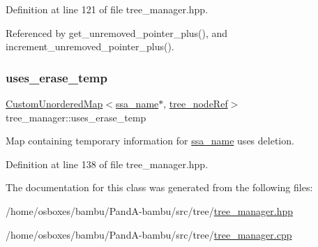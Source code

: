Definition at line 121 of file tree\+\_\+manager.\+hpp.



Referenced by get\+\_\+unremoved\+\_\+pointer\+\_\+plus(), and increment\+\_\+unremoved\+\_\+pointer\+\_\+plus().

\mbox{\label{classtree__manager_ab8e16b8e13c1b7d6f4bdc54d089e5ed1}} 
\subsubsection{\texorpdfstring{uses\+\_\+erase\+\_\+temp}{uses\_erase\_temp}}
{\footnotesize\ttfamily \hyperlink{custom__map_8hpp_ad1ed68f2ff093683ab1a33522b144adc}{Custom\+Unordered\+Map}$<$\hyperlink{structssa__name}{ssa\+\_\+name}$\ast$, \hyperlink{tree__node_8hpp_a6ee377554d1c4871ad66a337eaa67fd5}{tree\+\_\+node\+Ref}$>$ tree\+\_\+manager\+::uses\+\_\+erase\+\_\+temp\hspace{0.3cm}{\ttfamily [private]}}



Map containing temporary information for \hyperlink{structssa__name}{ssa\+\_\+name} uses deletion. 



Definition at line 138 of file tree\+\_\+manager.\+hpp.



The documentation for this class was generated from the following files\+:\begin{DoxyCompactItemize}
\item 
/home/osboxes/bambu/\+Pand\+A-\/bambu/src/tree/\hyperlink{tree__manager_8hpp}{tree\+\_\+manager.\+hpp}\item 
/home/osboxes/bambu/\+Pand\+A-\/bambu/src/tree/\hyperlink{tree__manager_8cpp}{tree\+\_\+manager.\+cpp}\end{DoxyCompactItemize}
